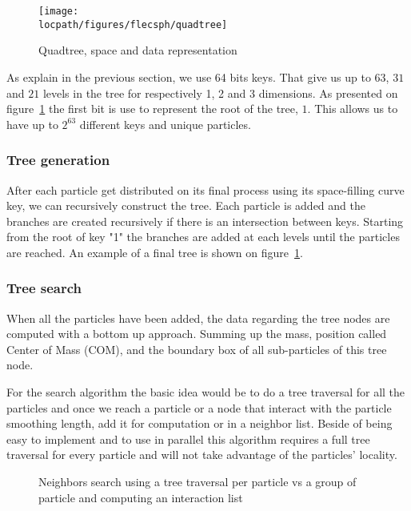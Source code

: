 \begin{figure}[t!]
\centering
\texttt{[image: \\locpath/figures/flecsph/quadtree]}
\caption{Quadtree, space and data representation}
\label{fig:quadtree}
\end{figure}

As explain in the previous section, we use 64 bits keys.
That give us up to $63$, $31$ and $21$ levels in the tree for respectively 1, 2 and 3 dimensions. 
As presented on figure~\ref{fig:quadtree} the first bit is use to represent the root of the tree, $1$.
This allows us to have up to $2^{63}$ different keys and unique particles.  

\subsubsection{Tree generation}

After each particle get distributed on its final process using its space-filling curve key, we can recursively construct the tree.
Each particle is added and the branches are created recursively if there is an intersection between keys. 
Starting from the root of key "1" the branches are added at each levels until the particles are reached.
An example of a final tree is shown on figure~\ref{fig:quadtree}.

\subsubsection{Tree search}

When all the particles have been added, the data regarding the tree nodes are computed with a bottom up approach. 
Summing up the mass, position called Center of Mass (COM), and the boundary box of all sub-particles of this tree node.

For the search algorithm the basic idea would be to do a tree traversal for all the particles and once we reach a particle or a node that interact with the particle smoothing length, add it for computation or in a neighbor list. 
Beside of being easy to implement and to use in parallel this algorithm requires a full tree traversal for every particle and will not take advantage of the particles' locality.

\begin{figure}[ht!]
\centering

\caption{Neighbors search using a tree traversal per particle vs a group of particle and computing an interaction list}
\label{fig:arbre}
\end{figure}

